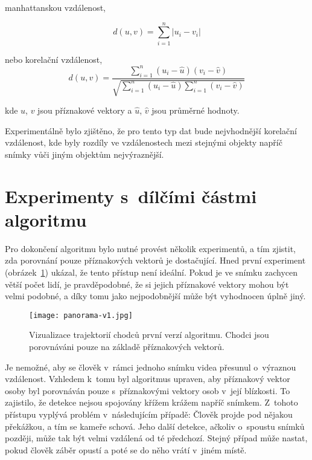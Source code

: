 manhattanskou vzdálenost,

\begin{equation}
    d(u,v) = \sum_{i=1}^{n} \left | u_i - v_i \right |
\end{equation}

nebo korelační vzdálenost,
\begin{equation}
    d(u,v) = \frac{\sum_{i=1}^{n} (u_i - \hat u) (v_i - \hat v)}{\sqrt{ \sum_{i=1}^{n} (u_i - \hat u) \sum_{i=1}^{n} (v_i - \hat v)}}
\end{equation}

kde $u$, $v$ jsou příznakové vektory a $\hat u$, $\hat v$ jsou průměrné hodnoty.

Experimentálně bylo zjištěno, že pro tento typ dat bude nejvhodnější korelační vzdálenost, kde byly rozdíly ve vzdálenostech mezi stejnými objekty napříč snímky vůči jiným objektům nejvýraznější.


\section{Experimenty s~dílčími částmi algoritmu}

Pro dokončení algoritmu bylo nutné provést několik experimentů, a tím zjistit, zda porovnání pouze příznakových vektorů je dostačující. Hned první experiment (obrázek~\ref{fig_panorama-v1}) ukázal, že tento přístup není ideální. Pokud je ve snímku zachycen větší počet lidí, je pravděpodobné, že si jejich příznakové vektory mohou být velmi podobné, a díky tomu jako nejpodobnější může být vyhodnocen úplně jiný.

\begin{figure}[H]
    \centering
    \texttt{[image: panorama-v1.jpg]}
    \caption[První verze algoritmu identifikace chodců]{Vizualizace trajektorií chodců první verzí algoritmu. Chodci jsou porovnáváni pouze na základě příznakových vektorů.}
    \label{fig_panorama-v1}
\end{figure}

Je nemožné, aby se člověk v~rámci jednoho snímku videa přesunul o~výraznou vzdálenost. Vzhledem k~tomu byl algoritmus upraven, aby příznakový vektor osoby byl porovnáván pouze s~příznakovými vektory osob v~její blízkosti. To zajistilo, že detekce nejsou spojovány křížem krážem napříč snímkem. Z~tohoto přístupu vyplývá problém v~následujícím případě: Člověk projde pod nějakou překážkou, a tím se kameře schová. Jeho další detekce, ačkoliv o~spoustu snímků později, může tak být velmi vzdálená od té předchozí. Stejný případ může nastat, pokud člověk záběr opustí a poté se do něho vrátí v~jiném místě.

